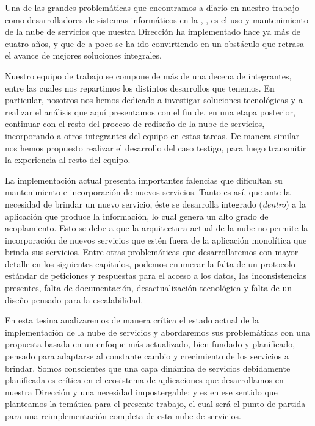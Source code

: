 Una de las grandes problemáticas que encontramos a diario en nuestro trabajo como desarrolladores de sistemas informáticos en la \direccionDesarrollo, \unlp, es el uso y mantenimiento de la nube de servicios que nuestra Dirección ha implementado hace ya más de cuatro años, y que de a poco se ha ido convirtiendo en un obstáculo que retrasa el avance de mejores soluciones integrales.

Nuestro equipo de trabajo se compone de más de una decena de integrantes, entre las cuales nos repartimos los distintos desarrollos que tenemos. En particular, nosotros nos hemos dedicado a investigar soluciones tecnológicas y a realizar el análisis que aquí presentamos con el fin de, en una etapa posterior, continuar con el resto del proceso de rediseño de la nube de servicios, incorporando a otros integrantes del equipo en estas tareas. De manera similar nos hemos propuesto realizar el desarrollo del caso testigo, para luego transmitir la experiencia al resto del equipo.

La implementación actual presenta importantes falencias que dificultan su mantenimiento e incorporación de nuevos servicios. Tanto es así, que ante la necesidad de brindar un nuevo servicio, éste se desarrolla integrado (\textit{dentro}) a la aplicación que produce la información, lo cual genera un alto grado de acoplamiento. Esto se debe a que la arquitectura actual de la nube no permite la incorporación de nuevos servicios que estén fuera de la aplicación monolítica que brinda sus servicios. Entre otras problemáticas que desarrollaremos con mayor detalle en los siguientes capítulos, podemos enumerar la falta de un protocolo estándar de peticiones y respuestas para el acceso a los datos, las inconsistencias presentes, falta de documentación, desactualización tecnológica y falta de un diseño pensado para la escalabilidad.

En esta tesina analizaremos de manera crítica el estado actual de la implementación de la nube de servicios y abordaremos sus problemáticas con una propuesta basada en un enfoque más actualizado, bien fundado y planificado, pensado para adaptarse al constante cambio y crecimiento de los servicios a brindar. Somos conscientes que una capa dinámica de servicios debidamente planificada es crítica en el ecosistema de aplicaciones que desarrollamos en nuestra Dirección y una necesidad impostergable; y es en ese sentido que planteamos la temática para el presente trabajo, el cual será el punto de partida para una reimplementación completa de esta nube de servicios.
